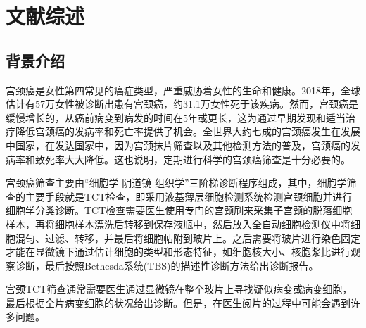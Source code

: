 \cleardoublepage
\chapter{文献综述}

\section{背景介绍}
\par 宫颈癌是女性第四常见的癌症类型，严重威胁着女性的生命和健康。2018年，全球估计有57万女性被诊断出患有宫颈癌，约31.1万女性死于该疾病。然而，宫颈癌是缓慢增长的，从癌前病变到病发的时间在5年或更长，这为通过早期发现和适当治疗降低宫颈癌的发病率和死亡率提供了机会。全世界大约七成的宫颈癌发生在发展中国家\cite{wild2014world}，在发达国家中，因为宫颈抹片筛查以及其他检测方法的普及，宫颈癌的发病率和致死率大大降低\cite{canavan2000cervical}。这也说明，定期进行科学的宫颈癌筛查是十分必要的。
\par 宫颈癌筛查主要由“细胞学-阴道镜-组织学”三阶梯诊断程序组成，其中，细胞学筛查的主要手段就是TCT检查，即采用液基薄层细胞检测系统检测宫颈细胞并进行细胞学分类诊断。TCT检查需要医生使用专门的宫颈刷来采集子宫颈的脱落细胞样本，再将细胞样本漂洗后转移到保存液瓶中，然后放入全自动细胞检测仪中将细胞混匀、过滤、转移，并最后将细胞帖附到玻片上。之后需要将玻片进行染色固定才能在显微镜下通过估计细胞的类型和形态特征，如细胞核大小、核胞浆比进行观察诊断，最后按照Bethesda系统(TBS)的描述性诊断方法给出诊断报告。
\par 宫颈TCT筛查通常需要医生通过显微镜在整个玻片上寻找疑似病变或病变细胞，最后根据全片病变细胞的状况给出诊断。但是，在医生阅片的过程中可能会遇到许多问题。

